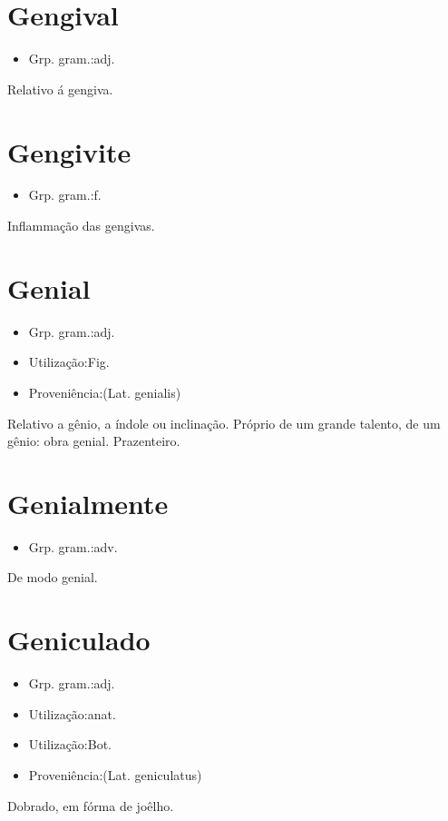 \section{Gengival}
\begin{itemize}
\item {Grp. gram.:adj.}
\end{itemize}
Relativo á gengiva.
\section{Gengivite}
\begin{itemize}
\item {Grp. gram.:f.}
\end{itemize}
Inflammação das gengivas.
\section{Genial}
\begin{itemize}
\item {Grp. gram.:adj.}
\end{itemize}
\begin{itemize}
\item {Utilização:Fig.}
\end{itemize}
\begin{itemize}
\item {Proveniência:(Lat. \textunderscore genialis\textunderscore )}
\end{itemize}
Relativo a gênio, a índole ou inclinação.
Próprio de um grande talento, de um gênio: \textunderscore obra genial\textunderscore .
Prazenteiro.
\section{Genialmente}
\begin{itemize}
\item {Grp. gram.:adv.}
\end{itemize}
De modo genial.
\section{Geniculado}
\begin{itemize}
\item {Grp. gram.:adj.}
\end{itemize}
\begin{itemize}
\item {Utilização:anat.}
\end{itemize}
\begin{itemize}
\item {Utilização:Bot.}
\end{itemize}
\begin{itemize}
\item {Proveniência:(Lat. \textunderscore geniculatus\textunderscore )}
\end{itemize}
Dobrado, em fórma de joêlho.

